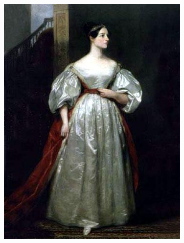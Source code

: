 \begin{multicols}{2}
	\begin{center}
		\includegraphics[height=.8\textheight]{./IMG/ada-lovelace.jpg}
	\end{center}
\end{multicols}

\vfill
\pagebreak


